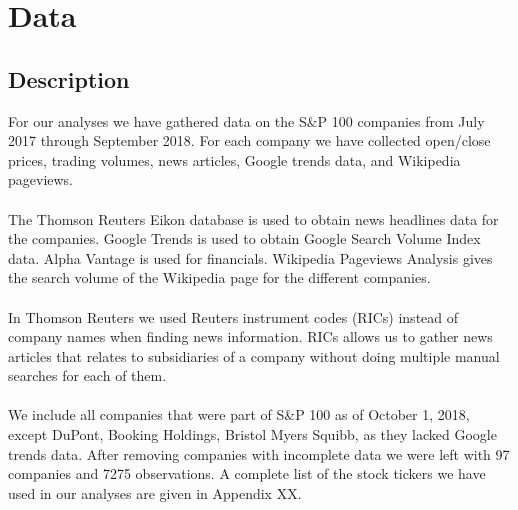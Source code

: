 
\chapter{Data}


\section{Description}
For our analyses we have gathered data on the  S\&P 100 companies from July 2017 through September 2018. For each company we have collected open/close prices, trading volumes, news articles, Google trends data, and Wikipedia pageviews.  
\\\\
The Thomson Reuters Eikon database is used to obtain news headlines data for the companies. Google Trends is used to obtain Google Search Volume Index data. Alpha Vantage is used for financials. Wikipedia Pageviews Analysis gives the search volume of the Wikipedia page for the different companies. 
\\\\
In Thomson Reuters we used Reuters instrument codes (RICs) instead of company names when finding news information. RICs allows us to  gather news articles that relates to subsidiaries of a company without doing multiple manual searches for each of them.
\\\\
We include all companies that were part of S\&P 100 as of October 1, 2018, except DuPont, Booking Holdings, Bristol Myers Squibb, as they lacked Google trends data. After removing companies with incomplete data we were left with 97 companies and 7275 observations. A complete list of the stock tickers we have used in our analyses are given in Appendix XX.


